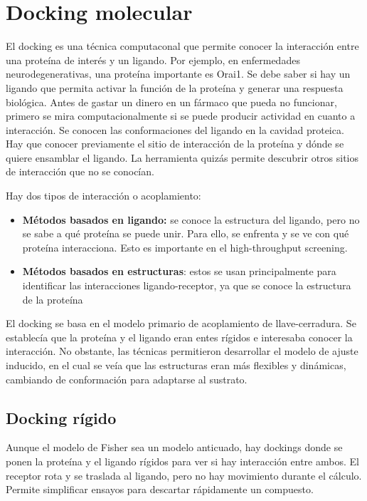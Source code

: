 \section{Docking molecular}
El docking es una técnica computaconal que permite conocer la interacción entre una proteína de interés y un ligando. Por ejemplo, en enfermedades neurodegenerativas, una proteína importante es Orai1. Se debe saber si hay un ligando que permita activar la función de la proteína y generar una respuesta biológica. Antes de gastar un dinero en un fármaco que pueda no funcionar, primero se mira computacionalmente si se puede producir actividad en cuanto a interacción. Se conocen las conformaciones del ligando en la cavidad proteica. Hay que conocer previamente el sitio de interacción de la proteína y dónde se quiere ensamblar el ligando. La herramienta quizás permite descubrir otros sitios de interacción que no se conocían. 

Hay dos tipos de interacción o acoplamiento:
\begin{itemize}
\item \textbf{Métodos basados en ligando:} se conoce la estructura del ligando, pero no se sabe a qué proteína se puede unir. Para ello, se enfrenta y se ve con qué proteína interacciona. Esto es importante en el high-throughput screening.
\item \textbf{Métodos basados en estructuras}: estos se usan principalmente para identificar las interacciones ligando-receptor, ya que se conoce la estructura de la proteína
\end{itemize}

El docking se basa en el modelo primario de acoplamiento de llave-cerradura. Se establecía que la proteína y el ligando eran entes rígidos e interesaba conocer la interacción. No obstante, las técnicas permitieron desarrollar el modelo de ajuste inducido, en el cual se veía que las estructuras eran más flexibles y dinámicas, cambiando de conformación para adaptarse al sustrato. 

\subsection{Docking rígido}
Aunque el modelo de Fisher sea un modelo anticuado, hay dockings donde se ponen la proteína y el ligando rígidos para ver si hay interacción entre ambos. El receptor rota y se traslada al ligando, pero no hay movimiento durante el cálculo. Permite simplificar ensayos para descartar rápidamente un compuesto.

